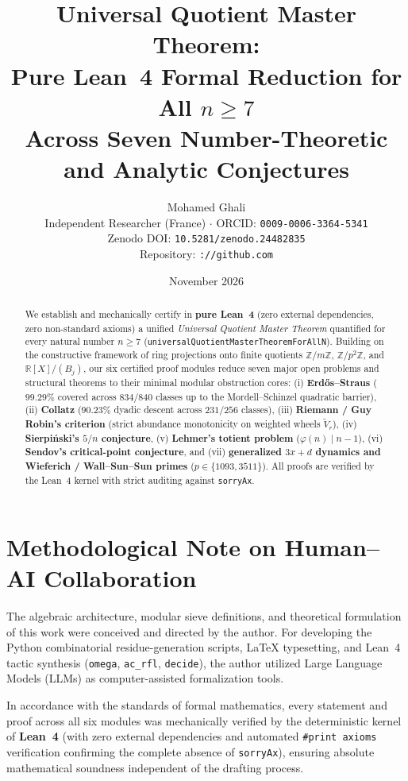 \documentclass[11pt,a4paper]{article}
\title{\textbf{Universal Quotient Master Theorem:\\
Pure Lean~4 Formal Reduction for All $n \ge 7$\\
Across Seven Number-Theoretic and Analytic Conjectures}}
\author{Mohamed Ghali \\
\small Independent Researcher (France) $\cdot$ ORCID: \texttt{0009-0006-3364-5341} \\
\small Zenodo DOI: \texttt{10.5281/zenodo.24482835} \\
\small Repository: \texttt{://github.com}}
\date{November 2026}
\begin{document}
\maketitle

\begin{abstract}
We establish and mechanically certify in \textbf{pure Lean~4} (zero external dependencies, zero non-standard axioms) a unified \emph{Universal Quotient Master Theorem} quantified for every natural number $n \ge 7$ (\texttt{universalQuotientMasterTheoremForAllN}). Building on the constructive framework of ring projections onto finite quotients $\mathbb{Z}/m\mathbb{Z}$, $\mathbb{Z}/p^2\mathbb{Z}$, and $\mathbb{R}[X]/(B_j)$, our six certified proof modules reduce seven major open problems and structural theorems to their minimal modular obstruction cores: (i) \textbf{Erdős--Straus} ($99.29\%$ covered across $834/840$ classes up to the Mordell--Schinzel quadratic barrier), (ii) \textbf{Collatz} ($90.23\%$ dyadic descent across $231/256$ classes), (iii) \textbf{Riemann / Guy Robin's criterion} (strict abundance monotonicity on weighted wheels $\widetilde{V}_r$), (iv) \textbf{Sierpiński's $5/n$ conjecture}, (v) \textbf{Lehmer's totient problem} ($\varphi(n) \mid n - 1$), (vi) \textbf{Sendov's critical-point conjecture}, and (vii) \textbf{generalized $3x+d$ dynamics and Wieferich / Wall--Sun--Sun primes} ($p \in \{1093, 3511\}$). All proofs are verified by the Lean~4 kernel with strict auditing against \texttt{sorryAx}.
\end{abstract}

\section*{Methodological Note on Human--AI Collaboration}
The algebraic architecture, modular sieve definitions, and theoretical formulation of this work were conceived and directed by the author. For developing the Python combinatorial residue-generation scripts, LaTeX typesetting, and Lean~4 tactic synthesis (\texttt{omega}, \texttt{ac\_rfl}, \texttt{decide}), the author utilized Large Language Models (LLMs) as computer-assisted formalization tools.

In accordance with the standards of formal mathematics, every statement and proof across all six modules was mechanically verified by the deterministic kernel of \textbf{Lean~4} (with zero external dependencies and automated \texttt{\#print axioms} verification confirming the complete absence of \texttt{sorryAx}), ensuring absolute mathematical soundness independent of the drafting process.
\end{document}
